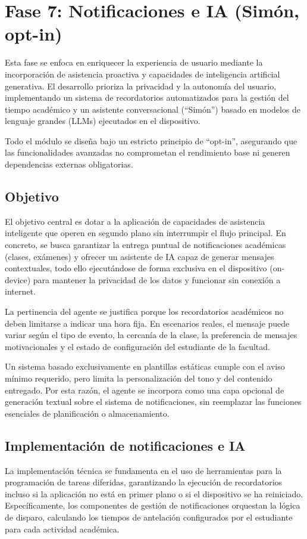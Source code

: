 \section{Fase 7: Notificaciones e IA (Simón, opt-in)}

Esta fase se enfoca en enriquecer la experiencia de usuario mediante la incorporación de asistencia proactiva y capacidades de inteligencia artificial generativa. El desarrollo prioriza la privacidad y la autonomía del usuario, implementando un sistema de recordatorios automatizados para la gestión del tiempo académico y un asistente conversacional (``Simón'') basado en modelos de lenguaje grandes (LLMs) ejecutados en el dispositivo.

Todo el módulo se diseña bajo un estricto principio de ``opt-in'', asegurando que las funcionalidades avanzadas no comprometan el rendimiento base ni generen dependencias externas obligatorias.

\subsection{Objetivo}
El objetivo central es dotar a la aplicación de capacidades de asistencia inteligente que operen en segundo plano sin interrumpir el flujo principal. En concreto, se busca garantizar la entrega puntual de notificaciones académicas (clases, exámenes) y ofrecer un asistente de IA capaz de generar mensajes contextuales, todo ello ejecutándose de forma exclusiva en el dispositivo (on-device) para mantener la privacidad de los datos y funcionar sin conexión a internet.

La pertinencia del agente se justifica porque los recordatorios académicos no deben limitarse a indicar una hora fija. En escenarios reales, el mensaje puede variar según el tipo de evento, la cercanía de la clase, la preferencia de mensajes motivacionales y el estado de configuración del estudiante de la facultad.

Un sistema basado exclusivamente en plantillas estáticas cumple con el aviso mínimo requerido, pero limita la personalización del tono y del contenido entregado. Por esta razón, el agente se incorpora como una capa opcional de generación textual sobre el sistema de notificaciones, sin reemplazar las funciones esenciales de planificación o almacenamiento.

\subsection{Implementación de notificaciones e IA}
La implementación técnica se fundamenta en el uso de herramientas para la programación de tareas diferidas, garantizando la ejecución de recordatorios incluso si la aplicación no está en primer plano o si el dispositivo se ha reiniciado. Específicamente, los componentes de gestión de notificaciones orquestan la lógica de disparo, calculando los tiempos de antelación configurados por el estudiante para cada actividad académica.

